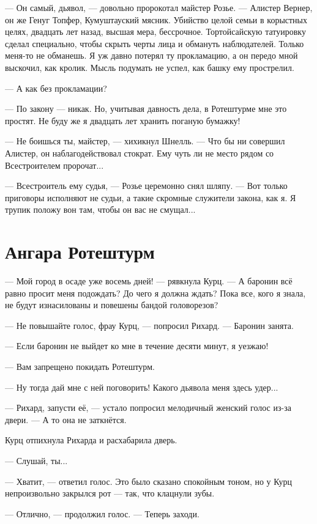 --- Он самый, дьявол, --- довольно пророкотал майстер Розье.
--- Алистер Вернер, он же Генуг Топфер, Кумуштауский мясник.
Убийство целой семьи в корыстных целях, двадцать лет назад, высшая мера, бессрочное.
Тортойсайскую татуировку сделал специально, чтобы скрыть черты лица и обмануть наблюдателей.
Только меня-то не обманешь.
Я уж давно потерял ту прокламацию, а он передо мной выскочил, как кролик.
Мысль подумать не успел, как башку ему прострелил.

--- А как без прокламации?

--- По закону --- никак.
Но, учитывая давность дела, в Ротештурме мне это простят.
Не буду же я двадцать лет хранить поганую бумажку!

--- Не боишься ты, майстер, --- хихикнул Шнелль.
--- Что бы ни совершил Алистер, он наблагодействовал стократ.
Ему чуть ли не место рядом со Всестроителем пророчат...

--- Всестроитель ему судья, --- Розье церемонно снял шляпу.
--- Вот только приговоры исполняют не судьи, а такие скромные служители закона, как я.
Я трупик положу вон там, чтобы он вас не смущал...

\section{Ангара Ротештурм}

--- Мой город в осаде уже восемь дней! --- рявкнула Курц.
--- А баронин всё равно просит меня подождать?
До чего я должна ждать?
Пока все, кого я знала, не будут изнасилованы и повешены бандой головорезов?

--- Не повышайте голос, фрау Курц, --- попросил Рихард.
--- Баронин занята.

--- Если баронин не выйдет ко мне в течение десяти минут, я уезжаю!

--- Вам запрещено покидать Ротештурм.

--- Ну тогда дай мне с ней поговорить!
Какого дьявола меня здесь удер...

--- Рихард, запусти её, --- устало попросил мелодичный женский голос из-за двери.
--- А то она не заткнётся.

Курц отпихнула Рихарда и расхабарила дверь.

--- Слушай, ты...

--- Хватит, --- ответил голос.
Это было сказано спокойным тоном, но у Курц непроизвольно закрылся рот --- так, что клацнули зубы.

--- Отлично, --- продолжил голос.
--- Теперь заходи.


